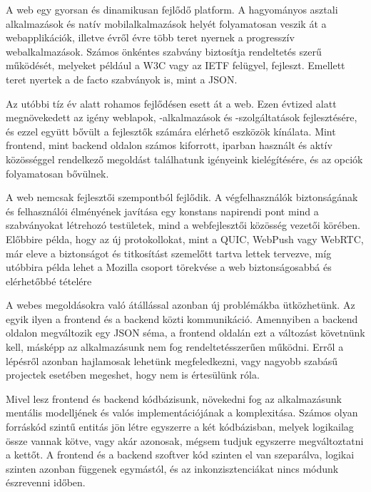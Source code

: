 A web egy gyorsan és dinamikusan fejlődő platform. A hagyományos asztali alkalmazások és natív mobilalkalmazások helyét folyamatosan veszik át a webapplikációk, illetve évről évre több teret nyernek a progresszív webalkalmazások. Számos önkéntes szabvány biztosítja rendeltetés szerű működését, melyeket például a W3C vagy az IETF felügyel, fejleszt. Emellett teret nyertek a de facto szabványok is, mint a JSON.\par

Az utóbbi tíz év alatt rohamos fejlődésen esett át a web. Ezen évtized alatt megnövekedett az igény weblapok, -alkalmazások és -szolgáltatások fejlesztésére, és ezzel együtt bővült a fejlesztők számára elérhető eszközök kínálata. Mint frontend, mint backend oldalon számos kiforrott, iparban használt és aktív közösséggel rendelkező megoldást találhatunk igényeink kielégítésére, és az opciók folyamatosan bővülnek. \par

A web nemcsak fejlesztői szempontból fejlődik. A végfelhasználók biztonságának és felhasználói élményének javítása egy konstans napirendi pont mind a szabványokat létrehozó testületek, mind a webfejlesztői közösség vezetői körében. Előbbire példa, hogy az új protokollokat, mint a QUIC, WebPush vagy WebRTC, már eleve a biztonságot és titkosítást szemelőtt tartva lettek tervezve, míg utóbbira példa lehet a Mozilla csoport törekvése a web biztonságosabbá és elérhetőbbé tételére \cite{mozillaVision}\par

A webes megoldásokra való átállással azonban új problémákba ütközhetünk. Az egyik ilyen a frontend és a backend közti kommunikáció. Amennyiben a backend oldalon megváltozik egy JSON séma, a frontend oldalán ezt a változást követnünk kell, másképp az alkalmazásunk nem fog rendeltetésszerűen működni. Erről a lépésről azonban hajlamosak lehetünk megfeledkezni, vagy nagyobb szabásű projectek esetében megeshet, hogy nem is értesülünk róla. \par 

Mivel lesz frontend és backend kódbázisunk, növekedni fog az alkalmazásunk mentális modelljének és valós implementációjának a komplexitása. Számos olyan forráskód szintű entitás jön létre egyszerre a két kódbázisban, melyek logikailag össze vannak kötve, vagy akár azonosak, mégsem tudjuk egyszerre megváltoztatni a kettőt. A frontend és a backend szoftver kód szinten el van szeparálva, logikai szinten azonban függenek egymástól, és az inkonzisztenciákat nincs módunk észrevenni időben.\par

